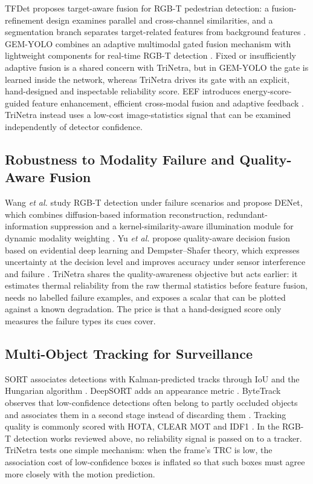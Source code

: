 \documentclass[journal]{IEEEtran}
\begin{document}
TFDet proposes target-aware fusion for RGB-T pedestrian detection: a fusion-refinement design examines parallel and cross-channel similarities, and a segmentation branch separates target-related features from background features \cite{tfdet}. GEM-YOLO combines an adaptive multimodal gated fusion mechanism with lightweight components for real-time RGB-T detection \cite{gemyolo}. Fixed or insufficiently adaptive fusion is a shared concern with TriNetra, but in GEM-YOLO the gate is learned inside the network, whereas TriNetra drives its gate with an explicit, hand-designed and inspectable reliability score. EEF introduces energy-score-guided feature enhancement, efficient cross-modal fusion and adaptive feedback \cite{eef}. TriNetra instead uses a low-cost image-statistics signal that can be examined independently of detector confidence.

\subsection{Robustness to Modality Failure and Quality-Aware Fusion}
Wang \emph{et al.} study RGB-T detection under failure scenarios and propose DENet, which combines diffusion-based information reconstruction, redundant-information suppression and a kernel-similarity-aware illumination module for dynamic modality weighting \cite{denet}. Yu \emph{et al.} propose quality-aware decision fusion based on evidential deep learning and Dempster--Shafer theory, which expresses uncertainty at the decision level and improves accuracy under sensor interference and failure \cite{qdfm}. TriNetra shares the quality-awareness objective but acts earlier: it estimates thermal reliability from the raw thermal statistics before feature fusion, needs no labelled failure examples, and exposes a scalar that can be plotted against a known degradation. The price is that a hand-designed score only measures the failure types its cues cover.

\subsection{Multi-Object Tracking for Surveillance}
SORT associates detections with Kalman-predicted tracks through IoU and the Hungarian algorithm \cite{sort,kalman,kuhn}. DeepSORT adds an appearance metric \cite{deepsort}. ByteTrack observes that low-confidence detections often belong to partly occluded objects and associates them in a second stage instead of discarding them \cite{bytetrack}. Tracking quality is commonly scored with HOTA, CLEAR MOT and IDF1 \cite{hota,clearmot,idf1}. In the RGB-T detection works reviewed above, no reliability signal is passed on to a tracker. TriNetra tests one simple mechanism: when the frame's TRC is low, the association cost of low-confidence boxes is inflated so that such boxes must agree more closely with the motion prediction.
\end{document}
